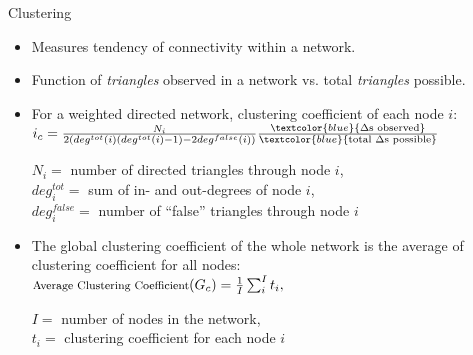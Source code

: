 \documentclass[10pt,xcolor={dvipsnames}]{beamer}
\begin{document}
\begin{frame}{Clustering}
    \begin{itemize}\itemsep20pt
        \small
        \item[\ding{213}] Measures tendency of connectivity within a network.
        \item[\ding{213}] Function of \textit{triangles} observed in a network vs. total \textit{triangles} possible.\\
        \item[\ding{213}] For a weighted directed network, clustering coefficient of each node $i$: \\
          \phantom{sakjflsajfdlksjf} $i_c = \frac{N_i}{2(deg^{tot}(i)(deg^{tot}(i)-1) - 2deg^{false}(i))} \hfill \frac{\textcolor{blue}{ \Delta \text{s observed}}}{\textcolor{blue}{\text{total } \Delta \text{s possible}}}$  \par
        \tiny
        $N_i = $ number of directed triangles through node $i$,\\
        $deg^{tot}_i = $ sum of in- and out-degrees of node $i$, \\
        $deg^{false}_i = $ number of ``false'' triangles through node $i$

        \small
        \item[\ding{213}] The global clustering coefficient of the whole network is the average of clustering coefficient for all nodes: \\
        \small \centering $ \text{\footnotesize Average Clustering Coefficient} (G_c) = \frac{1}{I}\sum_i^I t_i, $ \\
        \raggedright 
        \tiny
        $I = $ number of nodes in the network, \\
        $t_i = $ clustering coefficient for each node $i$\\
        
    \end{itemize}
\end{frame}
\end{document}
